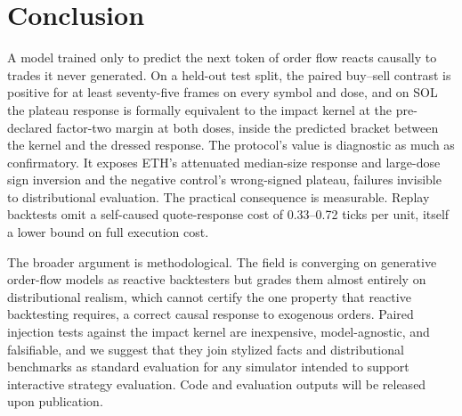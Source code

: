 \documentclass[sigconf,anonymous]{acmart}
\begin{document}
\section{Conclusion}

A model trained only to predict the next token of order flow reacts causally to trades it never generated. On a held-out test split, the paired buy--sell contrast is positive for at least seventy-five frames on every symbol and dose, and on SOL the plateau response is formally equivalent to the impact kernel at the pre-declared factor-two margin at both doses, inside the predicted bracket between the kernel and the dressed response. The protocol's value is diagnostic as much as confirmatory. It exposes ETH's attenuated median-size response and large-dose sign inversion and the negative control's wrong-signed plateau, failures invisible to distributional evaluation. The practical consequence is measurable. Replay backtests omit a self-caused quote-response cost of 0.33--0.72 ticks per unit, itself a lower bound on full execution cost.

The broader argument is methodological. The field is converging on generative order-flow models as reactive backtesters but grades them almost entirely on distributional realism, which cannot certify the one property that reactive backtesting requires, a correct causal response to exogenous orders. Paired injection tests against the impact kernel are inexpensive, model-agnostic, and falsifiable, and we suggest that they join stylized facts and distributional benchmarks as standard evaluation for any simulator intended to support interactive strategy evaluation. Code and evaluation outputs will be released upon publication.



\end{document}
